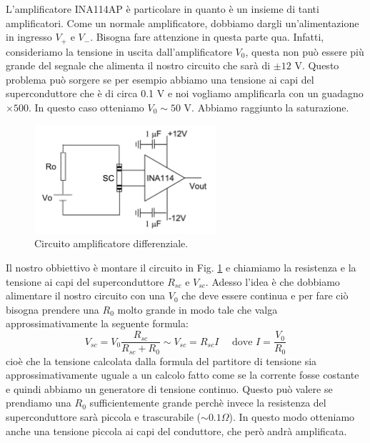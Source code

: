 \documentclass[../main/main.tex]{subfiles}
\begin{document}
L'amplificatore INA114AP è particolare in quanto è un insieme di tanti amplificatori. Come un normale amplificatore, dobbiamo dargli un'alimentazione in ingresso \( V_+ \) e \( V_- \). Bisogna fare attenzione in questa parte qua. Infatti, consideriamo la tensione in uscita dall'amplificatore \( V_0 \), questa non può essere più grande del segnale che alimenta il nostro circuito che sarà di \( \pm 12 \) V. Questo problema può sorgere se per esempio abbiamo una tensione ai capi del superconduttore che è di circa 0.1 V e noi vogliamo amplificarla con un guadagno \( \times 500 \). In questo caso otteniamo \( V_0 \sim 50 \) V. Abbiamo raggiunto la saturazione.


\begin{figure}[h!]
\centering
\includegraphics[width=0.6\textwidth]{../lessons/image/03/5.png}
\caption{\label{fig:3_5} Circuito amplificatore differenziale.}
\end{figure}

Il nostro obbiettivo è  montare il circuito in Fig. \ref{fig:3_5} e chiamiamo la resistenza e la tensione ai capi del superconduttore \( R_{sc} \) e \( V_{sc} \).
Adesso l'idea è che dobbiamo alimentare il nostro circuito con una \( V_0 \) che deve essere continua e per fare ciò bisogna prendere una  \( R_0 \) molto grande in modo tale che valga approssimativamente la seguente formula:
\begin{equation*}
 V_{sc} = V_0 \frac{R_{sc}}{R_{sc}+R_0} \sim V_{sc} = R_{sc} I \quad \text{ dove } I = \frac{V_0}{R_0}
\end{equation*}
cioè che la tensione calcolata dalla formula del partitore di tensione sia approssimativamente uguale a un calcolo fatto come se la corrente fosse costante e quindi abbiamo un generatore di tensione continuo.
Questo può valere se prendiamo una \( R_0 \) sufficientemente grande perchè invece la resistenza del superconduttore sarà piccola e trascurabile (\( \sim 0.1 \Omega \)). In questo modo otteniamo anche una tensione piccola ai capi del conduttore, che però andrà amplificata.
\end{document}
